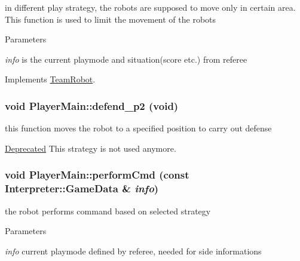 in different play strategy, the robots are supposed to move only in certain area. This function is used to limit the movement of the robots 


\begin{DoxyParams}{Parameters}
\item[{\em info}]is the current playmode and situation(score etc.) from referee \end{DoxyParams}


Implements \hyperlink{classTeamRobot_a71ec65db46db1ac511fe17b668d4f192}{TeamRobot}.

\hypertarget{classPlayerMain_a64e1d5734e07cfa82b2571aa11bb4f9d}{
\subsubsection[{defend\_\-p2}]{\setlength{\rightskip}{0pt plus 5cm}void PlayerMain::defend\_\-p2 (void)}}
\label{classPlayerMain_a64e1d5734e07cfa82b2571aa11bb4f9d}


this function moves the robot to a specified position to carry out defense 

\begin{Desc}
\item[\hyperlink{deprecated__deprecated000003}{Deprecated}]This strategy is not used anymore. \end{Desc}
\hypertarget{classPlayerMain_af12a95c226ce973056681a138b55fb6c}{
\subsubsection[{performCmd}]{\setlength{\rightskip}{0pt plus 5cm}void PlayerMain::performCmd (const {\bf Interpreter::GameData} \& {\em info})}}
\label{classPlayerMain_af12a95c226ce973056681a138b55fb6c}


the robot performs command based on selected strategy 


\begin{DoxyParams}{Parameters}
\item[{\em info}]current playmode defined by referee, needed for side informations \end{DoxyParams}



